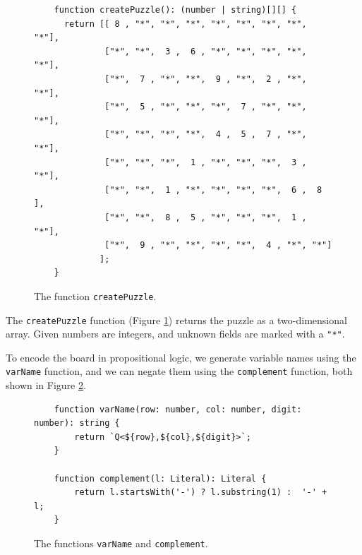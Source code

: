 \begin{figure}[!ht]
  \centering
\begin{verbatim}
    function createPuzzle(): (number | string)[][] {
      return [[ 8 , "*", "*", "*", "*", "*", "*", "*", "*"], 
              ["*", "*",  3 ,  6 , "*", "*", "*", "*", "*"],
              ["*",  7 , "*", "*",  9 , "*",  2 , "*", "*"],
              ["*",  5 , "*", "*", "*",  7 , "*", "*", "*"],
              ["*", "*", "*", "*",  4 ,  5 ,  7 , "*", "*"],
              ["*", "*", "*",  1 , "*", "*", "*",  3 , "*"],
              ["*", "*",  1 , "*", "*", "*", "*",  6 ,  8 ],
              ["*", "*",  8 ,  5 , "*", "*", "*",  1 , "*"],
              ["*",  9 , "*", "*", "*", "*",  4 , "*", "*"]
             ];
    }
\end{verbatim}
\vspace*{-0.3cm}
  \caption{The function \texttt{createPuzzle}.}
  \label{fig:logicsolver-createPuzzle}
\end{figure}

The \texttt{createPuzzle} function (Figure \ref{fig:logicsolver-createPuzzle}) returns the puzzle as a
two-dimensional array. Given numbers are integers, and unknown fields are marked with a \texttt{"*"}.  

To encode the board in propositional logic, we generate variable names using the \texttt{varName} function, and
we can negate them using the \texttt{complement} function, both shown in Figure \ref{fig:logicsolver-varName}. 

\begin{figure}[!ht]
  \centering
\begin{verbatim}
    function varName(row: number, col: number, digit: number): string {
        return `Q<${row},${col},${digit}>`;
    }

    function complement(l: Literal): Literal {
        return l.startsWith('-') ? l.substring(1) :  '-' + l;
    }
\end{verbatim}
\vspace*{-0.3cm}
  \caption{The functions \texttt{varName} and \texttt{complement}.}
  \label{fig:logicsolver-varName}
\end{figure} %

